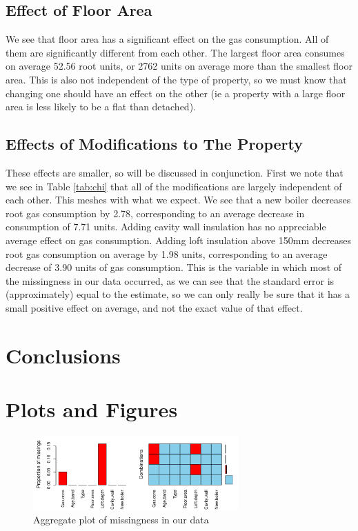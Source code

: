 \documentclass[8pt]{extarticle}
\begin{document}
\subsection{Effect of Floor Area}
We see that floor area has a significant effect on the gas consumption. All of them are significantly different from each other. The largest floor area consumes on average 52.56 root units, or 2762 units on average more than the smallest floor area. This is also not independent of the type of property, so we must know that changing one should have an effect on the other (ie a property with a large floor area is less likely to be a flat than detached).

\subsection{Effects of Modifications to The Property}
These effects are smaller, so will be discussed in conjunction. First we note that we see in Table \ref{tab:chi} that all of the modifications are largely independent of each other. This meshes with what we expect. We see that a new boiler decreases root gas consumption by 2.78, corresponding to an average decrease in consumption of 7.71 units. Adding cavity wall insulation has no appreciable average effect on gas consumption. Adding loft insulation above 150mm decreases root gas consumption on average by 1.98 units, corresponding to an average decrease of 3.90 units of gas consumption. This is the variable in which most of the missingness in our data occurred, as we can see that the standard error is (approximately) equal to the estimate, so we can only really be sure that it has a small positive effect on average, and not the exact value of that effect.


\section{Conclusions}


\pagebreak
%

\appendix

\section{Plots and Figures}

\begin{figure}[H]
	\centering
	\includegraphics[width=0.7\textwidth]{aggr_missplot}
	\caption{Aggregate plot of missingness in our data}
	\label{fig:aggrmiss}
\end{figure}
\end{document}
